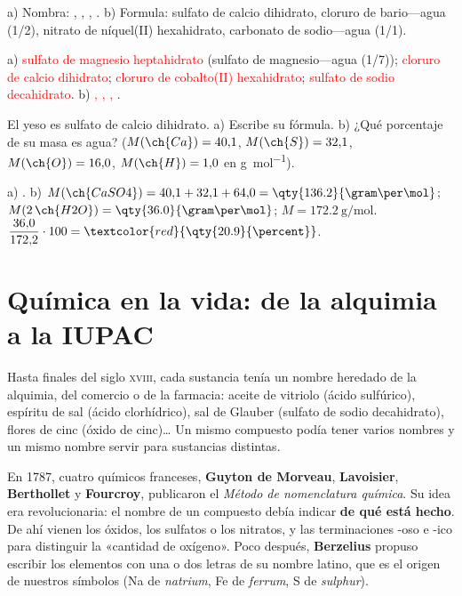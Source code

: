 \begin{exercise}
    a) Nombra: , , , . b) Formula: sulfato de calcio
    dihidrato, cloruro de bario---agua (1/2), nitrato de níquel(II) hexahidrato, carbonato de sodio---agua (1/1).
    \begin{solu}
        a) \textcolor{red}{sulfato de magnesio heptahidrato} (sulfato de magnesio---agua (1/7)); \textcolor{red}{cloruro de
        calcio dihidrato}; \textcolor{red}{cloruro de cobalto(II) hexahidrato}; \textcolor{red}{sulfato de sodio decahidrato}.
        b) \textcolor{red}{, , , }.
    \end{solu}
\end{exercise}

\begin{exercise}
    El yeso es sulfato de calcio dihidrato. a) Escribe su fórmula. b) ¿Qué porcentaje de su masa es agua?
    (\(M(\ch{Ca}) = 40{,}1\), \(M(\ch{S}) = 32{,}1\), \(M(\ch{O}) = 16{,}0\), \(M(\ch{H}) = 1{,}0\) en \unit{\gram\per\mol}).
    \begin{solu}
        a) \textcolor{red}{}. b) \(M(\ch{CaSO4}) = 40{,}1 + 32{,}1 + 64{,}0 = \qty{136.2}{\gram\per\mol}\);
        \(M(2\,\ch{H2O}) = \qty{36.0}{\gram\per\mol}\); \(M = \qty{172.2}{\gram\per\mol}\).
        \(\dfrac{36{,}0}{172{,}2} \cdot 100 = \textcolor{red}{\qty{20.9}{\percent}}\).
    \end{solu}
\end{exercise}

\section{Química en la vida: de la alquimia a la IUPAC}\label{sec:ud5-historia}

Hasta finales del siglo \textsc{xviii}, cada sustancia tenía un nombre heredado de la alquimia, del comercio o de la farmacia:
aceite de vitriolo (ácido sulfúrico), espíritu de sal (ácido clorhídrico), sal de Glauber (sulfato de sodio decahidrato), flores
de cinc (óxido de cinc)\dots{} Un mismo compuesto podía tener varios nombres y un mismo nombre servir para sustancias distintas.

En 1787, cuatro químicos franceses, \textbf{Guyton de Morveau}, \textbf{Lavoisier}, \textbf{Berthollet} y \textbf{Fourcroy},
publicaron el \textit{Método de nomenclatura química}. Su idea era revolucionaria: el nombre de un compuesto debía indicar
\textbf{de qué está hecho}. De ahí vienen los óxidos, los sulfatos o los nitratos, y las terminaciones -oso e -ico para
distinguir la «cantidad de oxígeno». Poco después, \textbf{Berzelius} propuso escribir los elementos con una o dos letras de su
nombre latino, que es el origen de nuestros símbolos (Na de \textit{natrium}, Fe de \textit{ferrum}, S de \textit{sulphur}).


